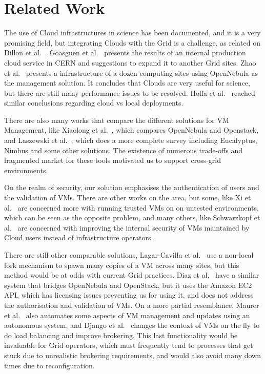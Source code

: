 \documentclass{llncs_Ibergrid2013}
\begin{document}
\section{Related Work}
\label{sect-relatedwork}
The use of Cloud infrastructures in science has been documented, and it is a very promising field, but integrating Clouds with the Grid is a challenge, as related on Dillon et al.~\cite{Dillon2010}. Goasguen et al.~\cite{Goasguen2012} presents the results of an internal production cloud service in CERN and suggestions to expand it to another Grid sites. Zhao et al.~\cite{Zhao2012} presents a infrastructure of a dozen computing sites using OpenNebula as the management solution. It concludes that Clouds are very useful for science, but there are still many performance issues to be resolved. Hoffa et al.~\cite{Hoffa2008} reached similar conclusions regarding cloud vs local deployments.

There are also many works that compare the different solutions for VM Management, like Xiaolong et al.~\cite{Xiaolong2012}, which compares OpenNebula and Openstack, and Laszewski et al.~\cite{Laszewski2012}, which does a more complete survey including Eucalyptus, Nimbus and some other solutions. The existence of numerous trade-offs and fragmented market for these tools motivated us to support cross-grid environments.

On the realm of security, our solution emphasises the authentication of users and the validation of VMs. There are other works on the area, but some, like Xi et al.~\cite{Xi2012} are concerned more with running trusted VMs on on untested environments, which can be seen as the opposite problem, and many others, like Schwarzkopf et al.~\cite{Schwarzkopf2012} are concerned with improving the internal security of VMs maintained by Cloud users instead of infrastructure operators.

There are still other comparable solutions, Lagar-Cavilla et al.~\cite{Lagar-Cavilla2009} use a non-local fork mechanism to spawn many copies of a VM across many sites, but this method would be at odds with current Grid practices. Diaz et al.~\cite{Diaz2012} have a similar system that bridges OpenNebula and OpenStack, but it uses the Amazon EC2 API, which has licensing issues preventing us for using it, and does not address the authorisation and validation of VMs. On a more partial resemblance, Maurer et al.~\cite{Maurer2013} also automates some aspects of VM management and updates using an autonomous system, and Django et al.~\cite{Django2013} changes the context of VMs on the fly to do load balancing and improve brokering. This last functionality would be invaluable for Grid operators, which must frequently tend to processes that get stuck due to unrealistic brokering requirements, and would also avoid many down times due to reconfiguration.
\end{document}
